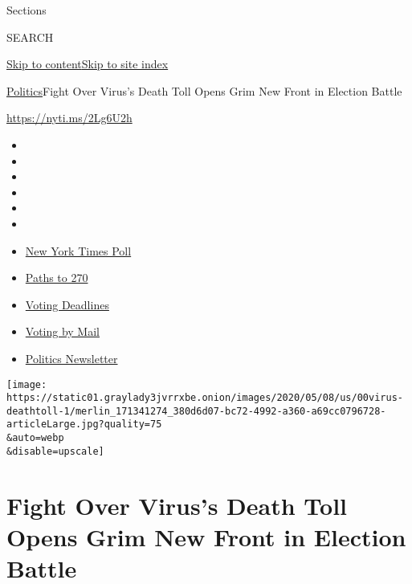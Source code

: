 Sections

SEARCH

\protect\hyperlink{site-content}{Skip to
content}\protect\hyperlink{site-index}{Skip to site index}

\href{/section/politics}{Politics}\textbar{}Fight Over Virus's Death
Toll Opens Grim New Front in Election Battle

\url{https://nyti.ms/2Lg6U2h}

\begin{itemize}
\item
\item
\item
\item
\item
\item
\end{itemize}

\begin{itemize}
\item
  \href{https://www.nytimes3xbfgragh.onion/2020/09/12/us/politics/biden-trump-poll-wisconsin-minnesota.html?action=click\&pgtype=Article\&state=default\&region=TOP_BANNER\&context=storylines_menu}{New
  York Times Poll}
\item
  \href{https://www.nytimes3xbfgragh.onion/interactive/2020/us/elections/election-states-biden-trump.html?action=click\&pgtype=Article\&state=default\&region=TOP_BANNER\&context=storylines_menu}{Paths
  to 270}
\item
  \href{https://www.nytimes3xbfgragh.onion/interactive/2019/us/elections/2020-presidential-election-calendar.html?action=click\&pgtype=Article\&state=default\&region=TOP_BANNER\&context=storylines_menu}{Voting
  Deadlines}
\item
  \href{https://www.nytimes3xbfgragh.onion/interactive/2020/08/31/us/politics/vote-by-mail-deadlines.html?action=click\&pgtype=Article\&state=default\&region=TOP_BANNER\&context=storylines_menu}{Voting
  by Mail}
\item
  \href{https://www.nytimes3xbfgragh.onion/newsletters/politics?action=click\&pgtype=Article\&state=default\&region=TOP_BANNER\&context=storylines_menu}{Politics
  Newsletter}
\end{itemize}

\texttt{[image: https://static01.graylady3jvrrxbe.onion/images/2020/05/08/us/00virus-deathtoll-1/merlin\_171341274\_380d6d07-bc72-4992-a360-a69cc0796728-articleLarge.jpg?quality=75\\\&auto=webp\\\&disable=upscale]}

\hypertarget{fight-over-viruss-death-toll-opens-grim-new-front-in-election-battle}{%
\section{Fight Over Virus's Death Toll Opens Grim New Front in Election
Battle}\label{fight-over-viruss-death-toll-opens-grim-new-front-in-election-battle}}

